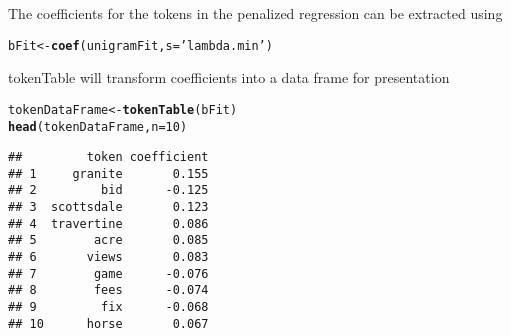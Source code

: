 \documentclass{article}\usepackage[]{graphicx}\usepackage[]{color}
\makeatletter
\newcommand{\hlnum}[1]{\textcolor[rgb]{0.686,0.059,0.569}{#1}}%
\newcommand{\hlstr}[1]{\textcolor[rgb]{0.192,0.494,0.8}{#1}}%
\newcommand{\hlstd}[1]{\textcolor[rgb]{0.345,0.345,0.345}{#1}}%
\newcommand{\hlkwb}[1]{\textcolor[rgb]{0.69,0.353,0.396}{#1}}%
\newcommand{\hlkwc}[1]{\textcolor[rgb]{0.333,0.667,0.333}{#1}}%
\newcommand{\hlkwd}[1]{\textcolor[rgb]{0.737,0.353,0.396}{\textbf{#1}}}%
\newenvironment{kframe}{%
 \def\at@end@of@kframe{}%
 \ifinner\ifhmode%
  \def\at@end@of@kframe{\end{minipage}}%
  \begin{minipage}{\columnwidth}%
 \fi\fi%
 \def\FrameCommand##1{\hskip\@totalleftmargin \hskip-\fboxsep
 \colorbox{shadecolor}{##1}\hskip-\fboxsep
     \hskip-\linewidth \hskip-\@totalleftmargin \hskip\columnwidth}%
 \MakeFramed {\advance\hsize-\width
   \@totalleftmargin\z@ \linewidth\hsize
   \@setminipage}}%
 {\par\unskip\endMakeFramed%
 \at@end@of@kframe}
\newenvironment{knitrout}{}{} %
\newcommand{\pkg}[1]{{\fontseries{b}\selectfont #1}}
\makeatother
\begin{document}
The coefficients for the tokens in the penalized regression can be extracted using
\begin{knitrout}\footnotesize
{}\color{fgcolor}\begin{kframe}
\begin{alltt}
\hlstd{bFit} \hlkwb{<-} \hlkwd{coef}\hlstd{(unigramFit ,} \hlkwc{s}\hlstd{=}\hlstr{'lambda.min'}\hlstd{)}
\end{alltt}
\end{kframe}
\end{knitrout}

\pkg{tokenTable} will transform coefficients into a data frame for presentation

\begin{knitrout}\footnotesize
{}\color{fgcolor}\begin{kframe}
\begin{alltt}
\hlstd{tokenDataFrame} \hlkwb{<-} \hlkwd{tokenTable}\hlstd{(bFit)}
\hlkwd{head}\hlstd{(tokenDataFrame ,} \hlkwc{n}\hlstd{=}\hlnum{10}\hlstd{)}
\end{alltt}
\begin{verbatim}
##         token coefficient
## 1     granite       0.155
## 2         bid      -0.125
## 3  scottsdale       0.123
## 4  travertine       0.086
## 5        acre       0.085
## 6       views       0.083
## 7        game      -0.076
## 8        fees      -0.074
## 9         fix      -0.068
## 10      horse       0.067
\end{verbatim}
\end{kframe}
\end{knitrout}
\end{document}
